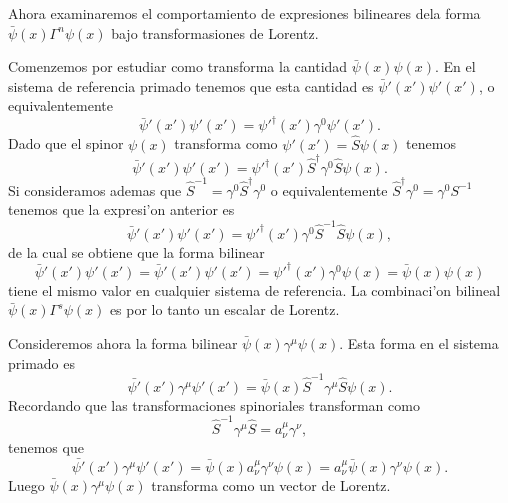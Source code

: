 Ahora examinaremos el comportamiento de expresiones bilineares dela forma
$\bar{\psi}(x)\Gamma^n\psi(x)$ bajo transformasiones de Lorentz.

Comenzemos por estudiar como transforma la cantidad $\bar{\psi}(x)\psi(x)$. En
el sistema de referencia primado tenemos que esta cantidad es
$\bar{\psi}'(x')\psi'(x')$, o equivalentemente
\begin{equation}
\bar{\psi}'(x')\psi'(x')=\psi'^\dagger(x')\gamma^0\psi'(x').
\end{equation}
Dado que el spinor $\psi(x)$ transforma como $\psi'(x')=\hat S\psi(x)$ tenemos
\begin{equation}
\bar{\psi}'(x')\psi'(x')=\psi'^\dagger(x')\hat S^\dagger\gamma^0\hat S\psi(x).
\end{equation}
Si consideramos ademas que $\hat S^{-1}=\gamma^0\hat S^\dagger\gamma^0$ o
equivalentemente $\hat S^\dagger\gamma^0=\gamma^0S^{-1}$ tenemos que la
expresi'on anterior es
\begin{equation}
\bar{\psi}'(x')\psi'(x')=\psi'^\dagger(x')\gamma^0\hat S^{-1}\hat S\psi(x),
\end{equation}
de la cual se obtiene que la forma bilinear
\begin{equation}
\bar{\psi}'(x')\psi'(x')=\bar{\psi}
'(x')\psi'(x')=\psi'^\dagger(x')\gamma^0\psi(x)=\bar{\psi}(x)\psi(x)
\end{equation}
tiene el mismo valor en cualquier sistema de referencia. La combinaci'on
bilineal $\bar{\psi}(x)\Gamma^s\psi(x)$ es por lo tanto un escalar de Lorentz.

Consideremos ahora la forma bilinear $\bar{\psi}(x)\gamma^\mu\psi(x)$. Esta
forma en el sistema primado es
\begin{equation}
\bar{\psi'}(x')\gamma^\mu\psi'(x')=\bar{\psi}(x)\hat S^{-1}\gamma^\mu\hat
S\psi(x).
\end{equation}
Recordando que las transformaciones spinoriales transforman como
\begin{equation}
\hat S^{-1}\gamma^\mu\hat S=a^\mu_\nu\gamma^\nu,
\end{equation}
tenemos que
\begin{equation}
\bar{\psi'}(x')\gamma^\mu\psi'(x')=\bar{\psi}(x)a^\mu_\nu\gamma^\nu\psi(x)=
a^\mu_\nu\bar{\psi}(x)\gamma^\nu\psi(x).
\end{equation}
Luego $\bar{\psi}(x)\gamma^\mu\psi(x)$ transforma como un vector de Lorentz.

